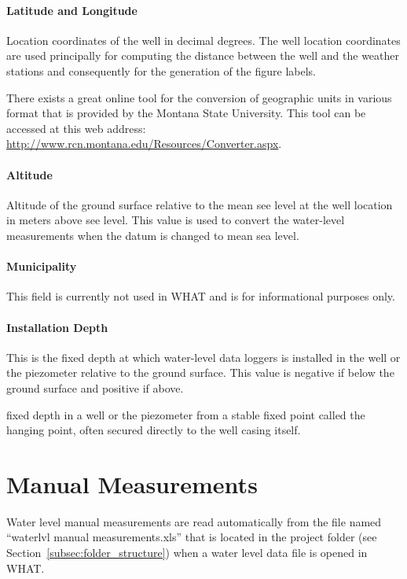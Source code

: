 \documentclass[WHATMANUAL.tex]{subfiles}
\begin{document}
\paragraph{Latitude and Longitude} Location coordinates of the well in decimal degrees. The well location coordinates are used principally for computing the distance between the well and the weather stations and consequently for the generation of the figure labels.

There exists a great online tool for the conversion of geographic units in various format that is provided by the Montana State University. This tool can be accessed at this web address: \url{http://www.rcn.montana.edu/Resources/Converter.aspx}.

\paragraph{Altitude} Altitude of the ground surface relative to the mean see level at the well location in meters above see level. This value is used to convert the water-level measurements when the datum is changed to mean sea level.

\paragraph{Municipality} This field is currently not used in WHAT and is for informational purposes only.

\paragraph{Installation Depth} This is the fixed depth at which water-level data loggers is installed in the well or the piezometer relative to the ground surface. This value is negative if below the ground surface and positive if above.

fixed depth in a well or the piezometer from a stable fixed point called the hanging point, often secured directly to the well casing itself.

\section{Manual Measurements}

Water level manual measurements are read automatically from the file named ``waterlvl manual measurements.xls'' that is located in the project folder (see Section~\ref{subsec:folder_structure}) when a water level data file is opened in WHAT.
\end{document}
